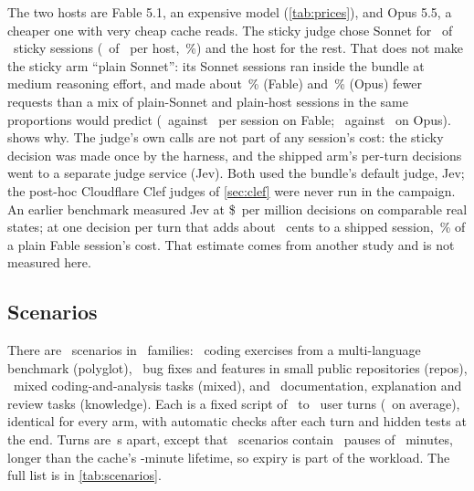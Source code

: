 \begin{table}[htbp]
\centering\small
\caption{Main-loop requests by host, arm, model and reasoning effort (``unset'' is the provider default).}
\label{tab:effortmix}

\end{table}

The two hosts are Fable 5.1, an expensive model (\cref{tab:prices}), and Opus 5.5, a cheaper one with very
cheap cache reads. The sticky judge chose Sonnet for
\NStickySonnetOnly\ of \NStickySessions\ sticky sessions (\StickyCheap\ of \StickyDecisions\ per host,
\StickyCheapPct\,\%) and the host for the rest. That does not make the sticky arm ``plain Sonnet'': its Sonnet
sessions ran inside the bundle at medium reasoning effort, and made about \RvReqGapFable\,\% (Fable) and
\RvReqGapOpus\,\% (Opus) fewer requests than a mix of plain-Sonnet and plain-host sessions in the same proportions
would predict (\RvReqActFable\ against \RvReqPredFable\ per session on Fable; \RvReqActOpus\ against \RvReqPredOpus\ on
Opus).  shows why. The judge's own calls are not part of any session's cost: the sticky decision was made once by the
harness, and the shipped arm's per-turn decisions went to a separate judge service (Jev). Both used the bundle's
default judge, Jev; the post-hoc Cloudflare Clef judges of \cref{sec:clef} were never run in the campaign. An earlier benchmark
measured Jev at \$\JevPerMillion\ per million decisions on comparable real states; at one decision per turn
that adds about \JudgeShippedCents\ cents to a shipped session, \JudgeShippedShare\,\% of a plain Fable
session's cost. That estimate comes from another study and is not measured here.

\subsection{Scenarios}

There are \NScenarios\ scenarios in \NFamilies\ families: \FamPolyglot\ coding exercises from a
multi-language benchmark (polyglot), \FamRepos\ bug fixes and features in small public repositories
(repos), \FamMixed\ mixed coding-and-analysis tasks (mixed), and \FamKnowledge\ documentation, explanation
and review tasks (knowledge). Each is a fixed script of \MinTurns\ to \MaxTurns\ user turns (\MeanTurns\ on
average), identical for every arm, with automatic checks after each turn and hidden tests at the end.
Turns are \ShortGapS\,s apart, except that \NLongGapScen\ scenarios contain \LongGapsPerScen\ pauses of
\LongGapMin\ minutes, longer than the cache's \CacheTTLMin-minute lifetime, so expiry is part of the
workload. The full list is in \cref{tab:scenarios}.

